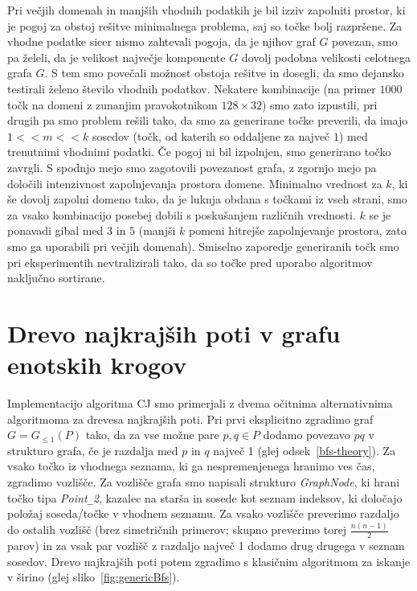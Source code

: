 \documentclass[a4paper, 12pt]{book}
\newcommand{\GG}{\ensuremath{G_{\le 1}}}
\newcommand{\U}{\texttt{\_}}
\begin{document}
Pri večjih domenah in manjših vhodnih podatkih je bil izziv zapolniti prostor, ki je pogoj za obstoj rešitve minimalnega problema, saj so točke bolj razpršene. Za vhodne podatke sicer nismo zahtevali pogoja, da je njihov graf $G$ povezan, smo pa želeli, da je velikost največje komponente $G$ dovolj podobna velikosti celotnega grafa $G$. S tem smo povečali možnost obstoja rešitve in dosegli, da smo dejansko testirali želeno število vhodnih podatkov. Nekatere kombinacije (na primer $1000$ točk na domeni z zunanjim pravokotnikom $128\times 32$) smo zato izpustili, pri drugih pa smo problem rešili tako, da smo za generirane točke preverili, da imajo $1 << m << k$ sosedov (točk, od katerih so oddaljene za največ $1$) med trenutnimi vhodnimi podatki. Če pogoj ni bil izpolnjen, smo generirano točko zavrgli. S spodnjo mejo smo zagotovili povezanost grafa, z zgornjo mejo pa določili intenzivnost zapolnjevanja prostora domene. Minimalno vrednost za $k$, ki še dovolj zapolni domeno tako, da je luknja obdana s točkami iz vseh strani, smo za vsako kombinacijo posebej dobili s poskušanjem različnih vrednosti. $k$ se je ponavadi gibal med $3$ in $5$ (manjši $k$ pomeni hitrejše zapolnjevanje prostora, zato smo ga uporabili pri večjih domenah). Smiselno zaporedje generiranih točk smo pri eksperimentih nevtralizirali tako, da so točke pred uporabo algoritmov naključno sortirane.

\section{Drevo najkrajših poti v grafu enotskih krogov}
Implementacijo algoritma CJ smo primerjali z dvema očitnima alternativnima algoritmoma za drevesa najkrajših poti. Pri prvi eksplicitno zgradimo graf $G=\GG(P)$ tako, da za vse možne pare $p, q\in P$ dodamo povezavo $pq$ v strukturo grafa, če je razdalja med $p$ in $q$ največ 1 (glej odsek~\ref{bfs-theory}). Za vsako točko iz vhodnega seznama, ki ga nespremenjenega hranimo ves čas, zgradimo vozlišče. Za vozlišče grafa smo napisali strukturo \textit{GraphNode}, ki hrani točko tipa \textit{Point\U 2}, kazalec na starša in sosede kot seznam indeksov, ki določajo položaj soseda/točke v vhodnem seznamu. Za vsako vozlišče preverimo razdaljo do ostalih vozlišč (brez simetričnih primerov; skupno preverimo torej $\frac{n(n-1)}{2}$ parov) in za vsak par vozlišč z razdaljo največ 1 dodamo drug drugega v seznam sosedov. Drevo najkrajših poti potem zgradimo s klasičnim algoritmom za iskanje v širino (glej sliko~\ref{fig:genericBfs}). 
\end{document}
